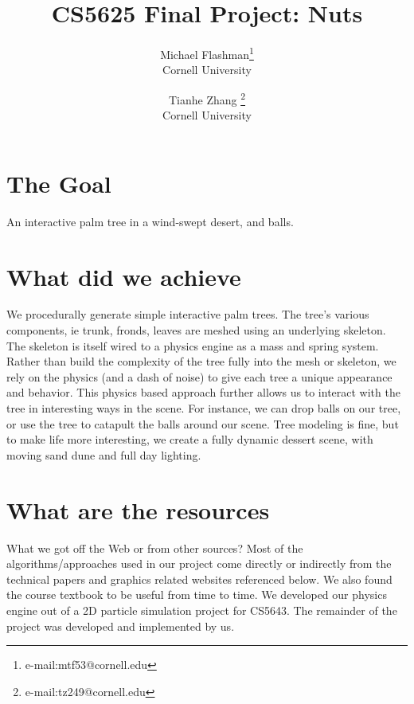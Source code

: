 \documentclass[annual]{acmsiggraph}
\title{CS5625 Final Project: Nuts}
\author{Michael Flashman\thanks{e-mail:mtf53@cornell.edu}\\Cornell University \and Tianhe Zhang \thanks{e-mail:tz249@cornell.edu}\\Cornell University}
\begin{document}
\maketitle


\section{The Goal}
An interactive palm tree in a wind-swept  desert, and balls.

\section{What did we achieve}
We procedurally generate  simple interactive palm trees.  The tree's various components, ie trunk, fronds, leaves are meshed using an underlying skeleton.  The skeleton is itself  wired to a physics engine as a mass and spring system.  Rather than build the complexity of the tree fully into the mesh or skeleton, we rely on the physics (and a dash of noise) to give each tree a unique appearance and  behavior.   This physics based approach further allows us to interact with the tree in interesting ways in the scene.   For instance, we can drop balls on our tree, or use the tree to  catapult the balls around our scene.  Tree modeling is fine, but to make life more interesting, we create a fully dynamic dessert scene, with moving sand dune and full day lighting.       

\section{What are the resources}

What we got off the Web or from other sources? Most of the algorithms/approaches used in our project come directly or indirectly from the technical papers and graphics related websites referenced below. We also found the course textbook to be useful from time to time. We developed our physics engine out of  a  2D particle simulation project for CS5643. The remainder of the project was developed and implemented by us.    
\end{document}

